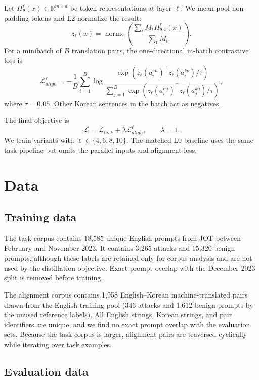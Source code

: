 \documentclass[10pt,twocolumn]{article}
\begin{document}
Let $H_\theta^\ell(x)\in\mathbb{R}^{m\times d}$ be token representations at
layer $\ell$. We mean-pool non-padding tokens and L2-normalize the result:
\begin{equation}
z_\ell(x)=\operatorname{norm}_2\left(
\frac{\sum_t M_t H_{\theta,t}^\ell(x)}{\sum_t M_t}\right).
\end{equation}
For a minibatch of $B$ translation pairs, the one-directional in-batch
contrastive loss is
\begin{equation}
\mathcal{L}_{align}^{\ell}
=-\frac{1}{B}\sum_{i=1}^{B}\log
\frac{\exp(z_\ell(a_i^{en})^\top z_\ell(a_i^{ko})/\tau)}
{\sum_{j=1}^{B}\exp(z_\ell(a_i^{en})^\top z_\ell(a_j^{ko})/\tau)},
\end{equation}
where $\tau=0.05$. Other Korean sentences in the batch act as negatives.

The final objective is
\begin{equation}
\mathcal{L}=\mathcal{L}_{task}+\lambda\mathcal{L}_{align}^{\ell},
\qquad \lambda=1.
\end{equation}
We train variants with $\ell\in\{4,6,8,10\}$. The matched L0 baseline uses the
same task pipeline but omits the parallel inputs and alignment loss.

\section{Data}

\subsection{Training data}

The task corpus contains 18,585 unique English prompts from JOT between
February and November 2023. It contains 3,265 attacks and 15,320 benign prompts,
although these labels are retained only for corpus analysis and are not used by
the distillation objective. Exact prompt overlap with the December 2023 split is
removed before training.

The alignment corpus contains 1,958 English--Korean machine-translated pairs
drawn from the English training pool (346 attacks and 1,612 benign prompts by
the unused reference labels). All English strings, Korean strings, and pair
identifiers are unique, and we find no exact prompt overlap with the evaluation
sets. Because the task corpus is larger, alignment pairs are traversed
cyclically while iterating over task examples.

\subsection{Evaluation data}
\end{document}
